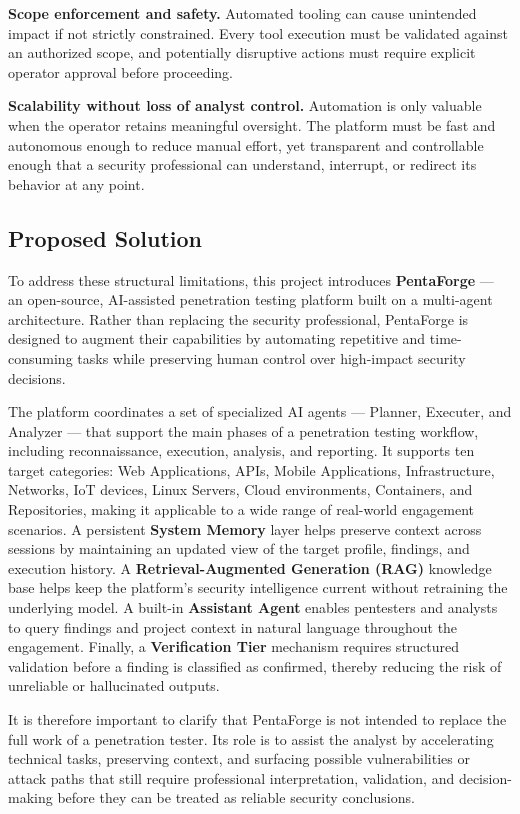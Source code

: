 \documentclass[12pt,a4paper]{report}
\begin{document}
\textbf{Scope enforcement and safety.} Automated tooling can cause unintended impact
if not strictly constrained. Every tool execution must be validated against an
authorized scope, and potentially disruptive actions must require explicit operator
approval before proceeding.

\textbf{Scalability without loss of analyst control.} Automation is only valuable
when the operator retains meaningful oversight. The platform must be fast and
autonomous enough to reduce manual effort, yet transparent and controllable enough
that a security professional can understand, interrupt, or redirect its behavior at
any point.

\subsection{Proposed Solution}

To address these structural limitations, this project introduces \textbf{PentaForge}
--- an open-source, AI-assisted penetration testing platform built on a multi-agent
architecture. Rather than replacing the security professional, PentaForge is designed
to augment their capabilities by automating repetitive and time-consuming tasks while
preserving human control over high-impact security decisions.

The platform coordinates a set of specialized AI agents --- Planner, Executer,
and Analyzer --- that support the main phases of a penetration testing workflow,
including reconnaissance, execution, analysis, and reporting. It supports ten
target categories: Web Applications, APIs, Mobile Applications, Infrastructure,
Networks, IoT devices, Linux Servers, Cloud environments, Containers, and
Repositories, making it applicable to a wide range of real-world engagement
scenarios. A persistent \textbf{System Memory} layer helps preserve context across sessions by maintaining an updated view of the target profile, findings, and execution history. A
\textbf{Retrieval-Augmented Generation (RAG)} knowledge base helps keep the
platform's security intelligence current without retraining the underlying model.
A built-in \textbf{Assistant Agent} enables pentesters and analysts to query
findings and project context in natural language throughout the engagement.
Finally, a \textbf{Verification Tier} mechanism requires structured validation
before a finding is classified as confirmed, thereby reducing the risk of unreliable
or hallucinated outputs.

It is therefore important to clarify that PentaForge is not intended to replace the
full work of a penetration tester. Its role is to assist the analyst by accelerating
technical tasks, preserving context, and surfacing possible vulnerabilities or attack
paths that still require professional interpretation, validation, and decision-making
before they can be treated as reliable security conclusions.
\end{document}
